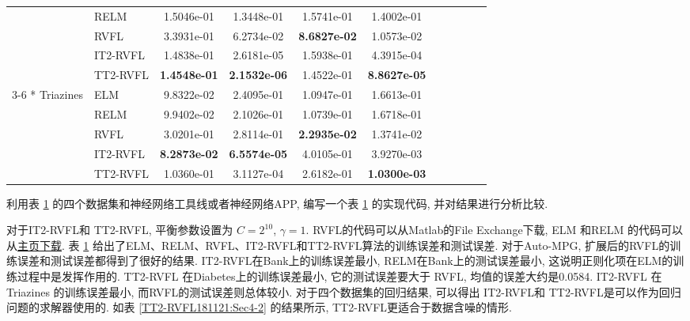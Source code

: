 \begin{table} [H]
\begin{center}
\begin{tabular} {llccccccccc}
&RELM   &1.5046e-01   &1.3448e-01   &1.5741e-01   &1.4002e-01 \\
&RVFL &3.3931e-01  & 6.2734e-02   &\textbf{8.6827e-02}  &  1.0573e-02\\
&IT2-RVFL&1.4838e-01  & 2.6181e-05  & 1.5938e-01  & 4.3915e-04\\
&TT2-RVFL&\textbf{1.4548e-01}  &  \textbf{2.1532e-06}   & 1.4522e-01  & \textbf{8.8627e-05} \\
\cline{3-6}
\multirow{5} {*} {Triazines} &ELM &9.8322e-02   &2.4095e-01   &1.0947e-01   &1.6613e-01   \\
&RELM    &9.9402e-02   &2.1026e-01   &1.0739e-01   &1.6718e-01\\
&RVFL &3.0201e-01 &  2.8114e-01  & \textbf{2.2935e-02}   & 1.3741e-02\\
&IT2-RVFL&\textbf{8.2873e-02}  &  \textbf{6.5574e-05}  &  4.0105e-01  & 3.9270e-03\\
&TT2-RVFL&1.0360e-01  & 3.1127e-04 &  2.6182e-01 &  \textbf{1.0300e-03} \\
\hline
\end{tabular}
\end{center}
\label{TT2-RVFL181116:Sec4-1}
\end{table}
\begin{remark}
   利用表 \ref{TT2-RVFL181116:Sec4-1} 的四个数据集和神经网络工具线或者神经网络APP, 编写一个表 \ref{TT2-RVFL181116:Sec4-1} 的实现代码, 并对结果进行分析比较.
\end{remark}
对于IT2-RVFL和 TT2-RVFL, 平衡参数设置为 $C=2^{10}$, $\gamma =1$.
RVFL的代码可以从Matlab的File Exchange下载,  ELM 和RELM 的代码可以从\href{https://www.ntu.edu.sg/home/egbhuang/elm_random_hidden_nodes.html}{主页下载}.
表 \ref{TT2-RVFL181116:Sec4-1} 给出了ELM、RELM、RVFL、IT2-RVFL和TT2-RVFL算法的训练误差和测试误差.
对于Auto-MPG, 扩展后的RVFL的训练误差和测试误差都得到了很好的结果.
IT2-RVFL在Bank上的训练误差最小, RELM在Bank上的测试误差最小, 这说明正则化项在ELM的训练过程中是发挥作用的.
TT2-RVFL 在Diabetes上的训练误差最小, 它的测试误差要大于 RVFL, 均值的误差大约是0.0584.
IT2-RVFL 在Triazines 的训练误差最小, 而RVFL的测试误差则总体较小.
对于四个数据集的回归结果, 可以得出 IT2-RVFL和 TT2-RVFL是可以作为回归问题的求解器使用的.
如表 \ref{TT2-RVFL181121:Sec4-2} 的结果所示, TT2-RVFL更适合于数据含噪的情形.
